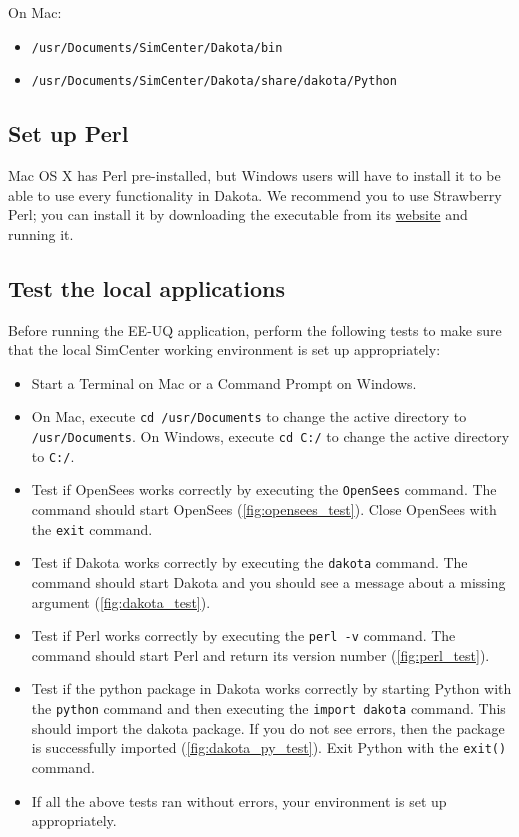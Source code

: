 On Mac:
\begin{itemize}
    \item \texttt{/usr/Documents/SimCenter/Dakota/bin}
    \item \texttt{/usr/Documents/SimCenter/Dakota/share/dakota/Python}
\end{itemize}

\subsection{Set up Perl}

Mac OS X has Perl pre-installed, but Windows users will have to install it to be able to use every functionality in Dakota. We recommend you to use Strawberry Perl; you can install it by downloading the executable from its \href{http://strawberryperl.com}{website} and running it.

\subsection{Test the local applications}

Before running the EE-UQ application, perform the following tests to make sure that the local SimCenter working environment is set up appropriately:

\begin{itemize}
    \item Start a Terminal on Mac or a Command Prompt on Windows.
    \item On Mac, execute \texttt{cd /usr/Documents} to change the active directory to \texttt{/usr/Documents}. On Windows, execute \texttt{cd C:/} to change the active directory to \texttt{C:/}.
    \item Test if OpenSees works correctly by executing the \texttt{OpenSees} command. The command should start OpenSees (\autoref{fig:opensees_test}). Close OpenSees with the \texttt{exit} command.
    \item Test if Dakota works correctly by executing the \texttt{dakota} command. The command should start Dakota and you should see a message about a missing argument (\autoref{fig:dakota_test}).
    \item Test if Perl works correctly by executing the \texttt{perl -v} command. The command should start Perl and return its version number (\autoref{fig:perl_test}).
    \item Test if the python package in Dakota works correctly by starting Python with the \texttt{python} command and then executing the \texttt{import dakota} command. This should import the dakota package. If you do not see errors, then the package is successfully imported (\autoref{fig:dakota_py_test}). Exit Python with the \texttt{exit()} command.
    \item If all the above tests ran without errors, your environment is set up appropriately.
\end{itemize}

